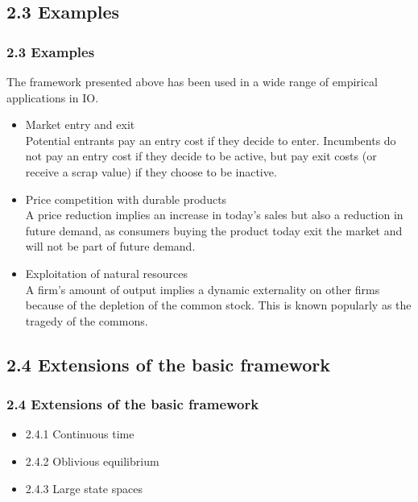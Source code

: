 \documentclass[aspectratio=169]{beamer}  %
\begin{document}
\subsection{2.3 Examples}
\begin{frame}
\frametitle{2.3 Examples}
The framework presented above has been used in a wide range of empirical applications in IO.
    \begin{itemize}
        \item Market entry and exit
        \\Potential entrants pay an entry cost if they decide to enter. Incumbents do not pay an entry cost if they decide to be active, but pay exit costs (or receive a scrap value) if they choose to be inactive.
        \item Price competition with durable products
        \\A price reduction implies an increase in today’s sales but also a reduction in future demand, as consumers buying the product today exit the market and will not be part of future demand.
        \item Exploitation of natural resources
        \\A firm’s amount of output implies a dynamic externality on other firms because of the depletion of the common stock. This is known popularly as the tragedy of the commons.
        \end{itemize}
\end{frame}


\subsection{2.4 Extensions of the basic framework}
\begin{frame}
\frametitle{2.4 Extensions of the basic framework}
    \begin{itemize}
        \item 2.4.1 Continuous time
        \item 2.4.2 Oblivious equilibrium
        \item 2.4.3 Large state spaces
    \end{itemize}

\end{frame}
\end{document}
